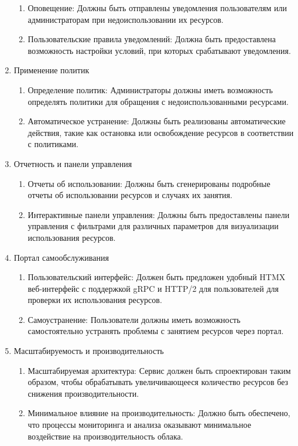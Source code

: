\documentclass[14pt, a4paper]{extarticle}
\begin{document}
\begin{enumerate}
\begin{enumerate}
        \item Оповещение: Должны быть отправлены уведомления пользователям или администраторам при недоиспользовании их ресурсов.
        \item Пользовательские правила уведомлений: Должна быть предоставлена возможность настройки условий, при которых срабатывают уведомления.
    \end{enumerate}
    \item Применение политик
    \begin{enumerate}
        \item Определение политик: Администраторы должны иметь возможность определять политики для обращения с недоиспользованными ресурсами.
        \item Автоматическое устранение: Должны быть реализованы автоматические действия, такие как остановка или освобождение ресурсов в соответствии с политиками.
    \end{enumerate}
    \item Отчетность и панели управления
    \begin{enumerate}
        \item Отчеты об использовании: Должны быть сгенерированы подробные отчеты об использовании ресурсов и случаях их занятия.
        \item Интерактивные панели управления: Должны быть предоставлены панели управления с фильтрами для различных параметров для визуализации использования ресурсов.
    \end{enumerate}
    \item Портал самообслуживания
    \begin{enumerate}
        \item Пользовательский интерфейс: Должен быть предложен удобный HTMX веб-интерфейс с поддержкой gRPC и HTTP/2 для пользователей для проверки их использования ресурсов.
        \item Самоустранение: Пользователи должны иметь возможность самостоятельно устранять проблемы с занятием ресурсов через портал.
    \end{enumerate}
    \item Масштабируемость и производительность
    \begin{enumerate}
        \item Масштабируемая архитектура: Сервис должен быть спроектирован таким образом, чтобы обрабатывать увеличивающееся количество ресурсов без снижения производительности.
        \item Минимальное влияние на производительность: Должно быть обеспечено, что процессы мониторинга и анализа оказывают минимальное воздействие на производительность облака.
    \end{enumerate}
\end{enumerate}
\end{document}
